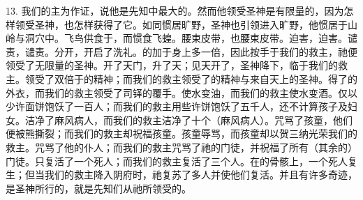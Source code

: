 13. 我们的主为作证，说他是先知中最大的。然而他领受圣神是有限量的，因为怎样领受圣神，也怎样获得了它。如同惯居旷野，圣神也引领进入旷野，他惯居于山岭与洞穴中。飞鸟供食于，而惯食飞蝗。腰束皮带，也腰束皮带。迫害，迫害。谴责，谴责。分开，开启了洗礼。的加于身上多一倍，因此按手于我们的救主，祂便领受了无限量的圣神。开了天门，升了天；见天开了，圣神降下，临于我们的救主。领受了双倍于的精神；而我们的救主领受了的精神与来自天上的圣神。得了的外衣，而我们的救主领受了司铎的覆手。使水变油，而我们的救主使水变酒。仅以少许面饼饱饫了一百人；而我们的救主用些许饼饱饫了五千人，还不计算孩子及妇女。洁净了麻风病人，而我们的救主洁净了十个（麻风病人）。咒骂了孩童，他们便被熊撕裂；而我们的救主却祝福孩童。孩童辱骂，而孩童却以贺三纳光荣我们的救主。咒骂了他的仆人；而我们的救主咒骂了祂的门徒，并祝福了所有（其余的）门徒。只复活了一个死人；而我们的救主复活了三个人。在的骨骸上，一个死人复生；但当我们的救主降入阴府时，祂复苏了多人并使他们复活。并且有许多奇迹，是圣神所行的，就是先知们从祂所领受的。\par

